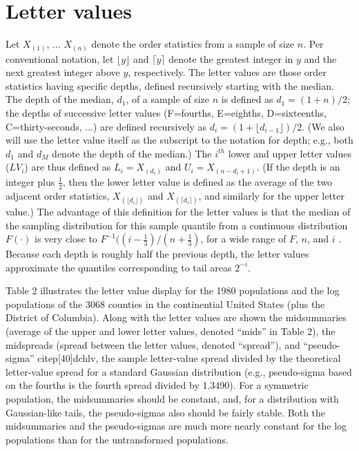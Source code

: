 \documentclass[oneside]{article}
\begin{document}
\section {Letter values}

Let $X_{(1)}$, ...  $X_{(n)}$ denote the order statistics
from a sample of size $n$.
Per conventional notation, let $\lfloor y \rfloor$ and
$\lceil y \rceil$ denote the greatest integer in $y$ and
the next greatest integer above $y$, respectively.
The letter values are those order statistics having specific
depths, defined recursively starting with the median.
The depth of the median, $d_1$, of a sample of size $n$
is defined as $d_1 = (1 +  n )/2$; the depths
of successive letter values (F=fourths, E=eighths, 
D=sixteenths, C=thirty-seconds, ...) are defined recursively 
as $d_i = (1 + \lfloor d_{i-1} \rfloor)/2$.  
(We also will use the letter value itself as the subscript
to the notation for depth; e.g., both $d_1$ and $d_M$ denote
the depth of the median.)
The $i^{th}$ lower and upper letter values  ($LV_i$) 
are thus defined as $L_i = X_{(d_i)}$ and
$U_i = X_{(n-d_i+1)}$.
(If the depth is an integer plus $\frac{1}{2}$, then the lower 
letter value is defined as the average of the two adjacent order
statistics, $X_{(\lfloor d_i \rfloor)}$ and
$X_{(\lceil d_i \rceil)}$, and similarly for the upper
letter value.)
The advantage of this definition for the letter values
is that the median of the sampling distribution for
this sample quantile from a
continuous distribution $F(\cdot)$ is very close to
$F^{-1} ((i - \frac{1}{3})/(n + \frac{1}{3})$, for a 
wide range of $F$, $n$, and $i$ \citep{dchlv}.
Because each depth is roughly half the previous depth,
the letter values approximate the quantiles corresponding
to tail areas $2^{-i}$.

Table 2 illustrates the letter value display for the 1980 
populations and the log populations of the 3068 counties in 
the continential United States (plus the District of Columbia).
Along with the letter values are shown the midsummaries
(average of the upper and lower letter values, denoted ``mids''
in Table 2), 
the midspreads (spread between the letter values, denoted
``spread''), and ``pseudo-sigma'' citep[40]{dchlv}, 
the sample letter-value spread divided by the theoretical
letter-value spread for a standard Gaussian
distribution (e.g., pseudo-sigma based on the fourths is 
the fourth spread divided by 1.3490).
For a symmetric population, the midsummaries should
be constant, and, for a distribution with Gaussian-like
tails, the pseudo-sigmas also should be fairly stable.
Both the midsummaries and the pseudo-sigmas are much more
nearly constant for the log populations than for the
untransformed populations.
\end{document}
